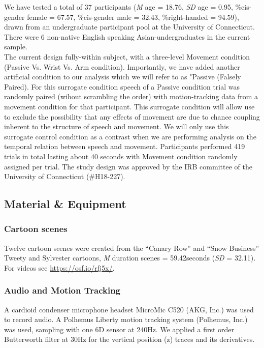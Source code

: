 \documentclass[
  man,floatsintext]{apa6}
\begin{document}
We have tested a total of 37 participants (\emph{M} age = 18.76, \emph{SD} age = 0.95, \%cis-gender female = 67.57, \%cis-gender male = 32.43, \%right-handed = 94.59), drawn from an undergraduate participant pool at the University of Connecticut. There were 6 non-native English speaking Asian-undergraduates in the current sample.\\
The current design fully-within subject, with a three-level Movement condition (Passive Vs. Wrist Vs. Arm condition). Importantly, we have added another artificial condition to our analysis which we will refer to as "Passive (Falsely Paired). For this surrogate condition speech of a Passive condition trial was randomly paired (wihout scrambling the order) with motion-tracking data from a movement condition for that participant. This surrogate condition will allow use to exclude the possibility that any effects of movement are due to chance coupling inherent to the structure of speech and movement. We will only use this surrogate control condition as a contrast when we are performing analysis on the temporal relation between speech and movement.
Participants performed 419 trials in total lasting about 40 seconds with Movement condition randomly assigned per trial. The study design was approved by the IRB committee of the University of Connecticut (\#H18-227).

\hypertarget{material-equipment}{%
\subsection{Material \& Equipment}\label{material-equipment}}

\hypertarget{cartoon-scenes}{%
\subsubsection{Cartoon scenes}\label{cartoon-scenes}}

Twelve cartoon scenes were created from the ``Canary Row'' and ``Snow Business'' Tweety and Sylvester cartoons, \emph{M} duration scenes = 59.42seconds (\emph{SD} = 32.11). For videos see \url{https://osf.io/rfj5x/}.

\hypertarget{audio-and-motion-tracking}{%
\subsubsection{Audio and Motion Tracking}\label{audio-and-motion-tracking}}

A cardioid condenser microphone headset MicroMic C520 (AKG, Inc.) was used to record audio. A Polhemus Liberty motion tracking system (Polhemus, Inc.) was used, sampling with one 6D sensor at 240Hz. We applied a first order Butterworth filter at 30Hz for the vertical position (z) traces and its derivatives.
\end{document}
